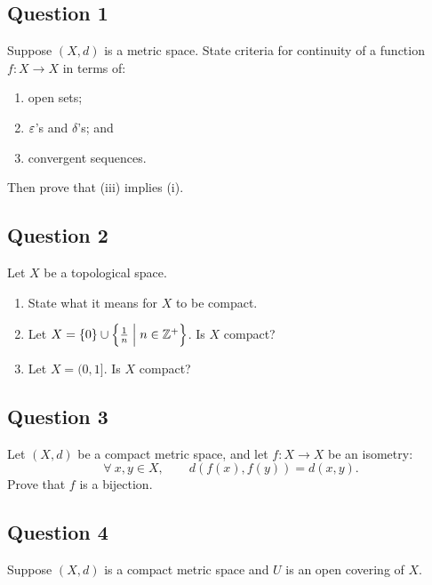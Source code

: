 \documentclass[12pt]{article}
\begin{document}
\hypertarget{question-1-3}{%
\subsection{Question 1}\label{question-1-3}}

Suppose \((X, d)\) is a metric space. State criteria for continuity of a
function \(f : X \to X\) in terms of:

\begin{enumerate}
\def\labelenumi{\roman{enumi}.}
\item
  open sets;
\item
  \(\varepsilon\)'s and \(\delta\)'s; and
\item
  convergent sequences.
\end{enumerate}

Then prove that (iii) implies (i).

\hypertarget{question-2-3}{%
\subsection{Question 2}\label{question-2-3}}

Let \(X\) be a topological space.

\begin{enumerate}
\def\labelenumi{\roman{enumi}.}
\item
  State what it means for \(X\) to be compact.
\item
  Let \(X = \left\{{0}\right\} \cup \left\{{{1\over n} \mathrel{\Big|} n \in {\mathbb{Z}}^+ }\right\}\). Is
  \(X\) compact?
\item
  Let \(X = (0, 1]\). Is \(X\) compact?
\end{enumerate}

\hypertarget{question-3-3}{%
\subsection{Question 3}\label{question-3-3}}

Let \((X, d)\) be a compact metric space, and let \(f : X \to X\) be an
isometry: \[\forall~ x, y \in X, \qquad d(f (x), f (y)) = d(x, y).\]
Prove that \(f\) is a bijection.

\hypertarget{question-4-3}{%
\subsection{Question 4}\label{question-4-3}}

Suppose \((X, d)\) is a compact metric space and \(U\) is an open
covering of \(X\).
\end{document}
